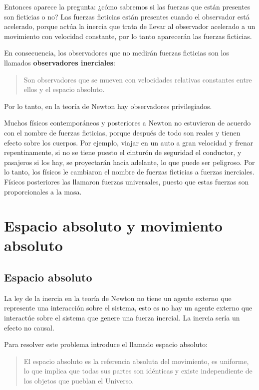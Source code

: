 \documentclass[../apunte_mecanica_clasica.tex]{subfiles}%
\begin{document}
Entonces aparece la pregunta: ¿cómo sabremos si las fuerzas que están presentes son ficticias o no? Las fuerzas ficticias están presentes cuando el observador está acelerado, porque actúa la inercia que trata de llevar al observador acelerado a un movimiento con velocidad constante, por lo tanto aparecerán las fuerzas ficticias.

En consecuencia, los observadores que no medirán fuerzas ficticias son los llamados \textbf{observadores inerciales}:
\begin{quote}
Son observadores que se mueven con velocidades relativas constantes entre ellos y el espacio absoluto.
\end{quote}
Por lo tanto, en la teoría de Newton hay observadores privilegiados.

Muchos físicos contemporáneos y posteriores a Newton no estuvieron de acuerdo con el nombre de fuerzas ficticias, porque después de todo son reales y tienen efecto sobre los cuerpos. Por ejemplo, viajar en un auto a gran velocidad y frenar repentinamente, si no se tiene puesto el cinturón de seguridad el conductor, y pasajeros si los hay, se proyectarán hacia adelante, lo que puede ser peligroso. Por lo tanto, los físicos le cambiaron el nombre de fuerzas ficticias a fuerzas inerciales. Físicos posteriores las llamaron fuerzas universales, puesto que estas fuerzas son proporcionales a la masa.

\section{Espacio absoluto y movimiento absoluto}

\subsection{Espacio absoluto}

La ley de la inercia en la teoría de Newton no tiene un agente externo que represente una interacción sobre el sistema, esto es no hay un agente externo que interactúe sobre el sistema que genere una fuerza inercial. La inercia sería un efecto no causal.

Para resolver este problema introduce el llamado espacio absoluto:
\begin{quote}
El espacio absoluto es la referencia absoluta del movimiento, es uniforme, lo que implica que todas sus partes son idénticas y existe independiente de los objetos que pueblan el Universo.
\end{quote}
\end{document}
